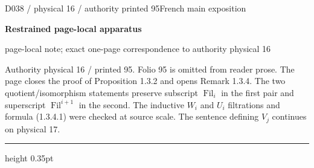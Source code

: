 \documentclass[9pt]{article}
\newcommand{\CanonText}[1]{\par{\fontsize{8.0}{9.35}\selectfont\RaggedRight #1\par}\vspace{2.2pt}}
\newcommand{\LayerTitle}{Restrained page-local apparatus}
\begin{document}
\noindent\begin{minipage}[t][\dimexpr\textheight-5pt\relax][t]{\textwidth}
{\sffamily\fontsize{7.3}{8.2}\selectfont\color{Quiet} D038 / physical 16 / authority printed 95\hfill French main exposition}
\par{}\vspace{4.5pt}
{\sffamily\fontsize{10.4}{11.6}\selectfont\bfseries\color{Accent} \LayerTitle}
\par{\sffamily\fontsize{6.7}{7.7}\selectfont\color{Quiet} page-local note; exact one-page correspondence to authority physical 16}
\vspace{5pt}
\CanonText{Authority physical 16 / printed 95. Folio 95 is omitted from reader prose. The page closes the proof of Proposition 1.3.2 and opens Remark 1.3.4. The two quotient/isomorphism statements preserve subscript \(\operatorname{Fil}_{i}\) in the first pair and superscript \(\operatorname{Fil}^{i+1}\) in the second. The inductive \(W_{i}\) and \(U_{i}\) filtrations and formula (1.3.4.1) were checked at source scale. The sentence defining \(V_{j}\) continues on physical 17.}
\vfill
{\color{Accent}\hrule height 0.35pt}\vspace{3pt}
\end{minipage}
\newpage
\end{document}
